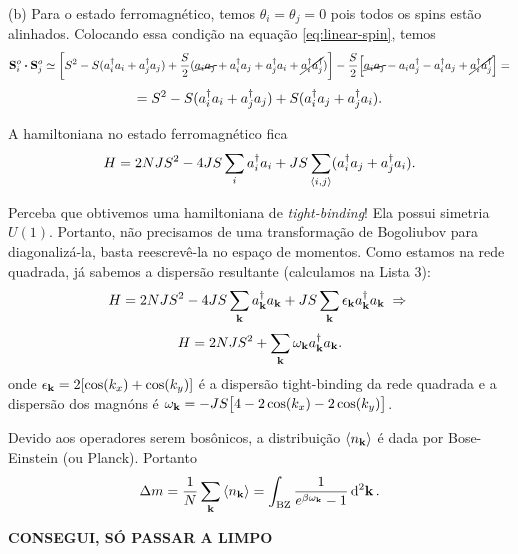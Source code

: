 \documentclass[a4paper,10pt]{article}
\begin{document}
\n

(b) Para o estado ferromagnético, temos $\theta_i = \theta_j = 0$ pois todos os spins estão alinhados. Colocando essa condição na equação \ref{eq:linear-spin}, temos
$$
\vb{S}_i^o \vdot \vb{S}_j^o \simeq
\qty[
S^2 - S(a_i^\d a_i + a_j^\d a_j) +
\frac{S}{2} (\cancel{a_i a_j} + a_i^\d a_j + a_j^\d a_i + \cancel{a_i^\d a_j^\d})
]
-\frac{S}{2}
\Big[
\cancel{a_ia_j} - a_ia_j^\d - a_i^\d a_j + \cancel{a_i^\d a_j^\d}
\Big] =
$$
$$
= S^2 - S (a_i^\dagger a_i + a_j^\dagger a_j) + S (a_i^\dagger a_j + a_j^\dagger a_i).
$$

A hamiltoniana no estado ferromagnético fica
$$
H = 2 N J S^2 - 4 JS \sum_{i} a_i^\dagger a_i + JS \sum_{\left\langle i , j \right\rangle} (a_i^\dagger a_j + a_j^\dagger a_i).
$$

Perceba que obtivemos uma hamiltoniana de \textit{tight-binding}! Ela possui simetria $U(1)$. Portanto, não precisamos de uma transformação de Bogoliubov para diagonalizá-la, basta reescrevê-la no espaço de momentos. Como estamos na rede quadrada, já sabemos a dispersão resultante (calculamos na Lista 3):
$$
H = 2 N J S^2 - 4 JS \sum_{\vb{k}} a_{\vb{k}}^\dagger a_{\vb{k}} + JS \sum_{\vb{k}} \epsilon_{\vb{k}} a_{\vb{k}}^\dagger a_{\vb{k}} \; \Rightarrow \;
$$
$$
H = 2 N J S^2 + \sum_{\vb{k}} \omega_{\vb{k}} a_{\vb{k}}^\dagger a_{\vb{k}}.
$$
onde $\epsilon_{\vb{k}} = 2 [\cos(k_x) + \cos(k_y)]$ é a dispersão tight-binding da rede quadrada e a dispersão dos magnóns é $\omega_{\vb{k}} = - JS \big[4 - 2 \cos(k_x) - 2 \cos(k_y) \big]$.

Devido aos operadores serem bosônicos, a distribuição $\ev{n_{\k}}$ é dada por Bose-Einstein (ou Planck). Portanto
$$
\Delta m = \frac{1}{N} \sum_{\k} \ev{n_{\k}} = \int_{\text{BZ}} \frac{1}{e^{\beta \omega_{\k}}-1} \dd[2]{\k}.
$$

\textbf{CONSEGUI, SÓ PASSAR A LIMPO}
\end{document}
